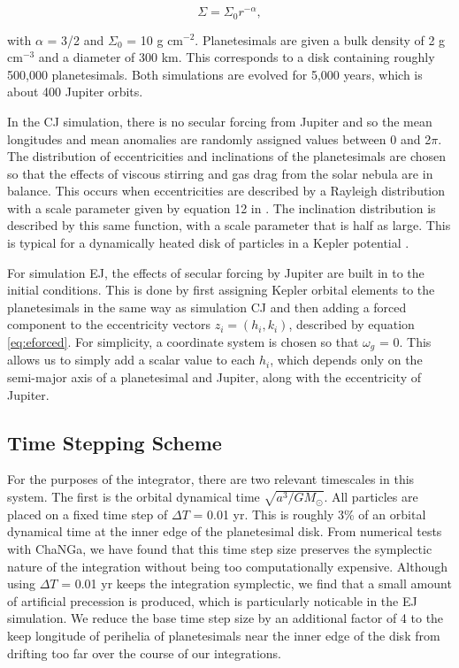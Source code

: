 \documentclass[onecolumn]{aastex63}
\begin{document}
\begin{equation}\label{eq:surf_den}
	\Sigma = \Sigma_{0} r^{-\alpha},
\end{equation}

\noindent with $\alpha$ = 3/2 and $\Sigma_{0}$ = 10 g cm$^{-2}$. Planetesimals are given a bulk density of 2 g cm$^{-3}$ and a 
diameter of 300 km. This corresponds to a disk containing roughly 500,000 planetesimals. Both simulations are evolved for 
5,000 years, which is about 400 Jupiter orbits.

In the CJ simulation, there is no secular forcing from Jupiter and so the mean longitudes and mean anomalies are randomly 
assigned values between 0 and 2$\pi$. The distribution of eccentricities and inclinations of the planetesimals are chosen so that the 
effects of viscous stirring and gas drag from the solar nebula are in balance. This occurs when eccentricities are described by a 
Rayleigh distribution with a scale parameter given by equation 12 in \citet{2002ApJ...581..666K}. The inclination distribution is 
described by this same function, with a scale parameter that is half as large. This is typical for a dynamically heated disk 
of particles in a Kepler potential \citep{1993MNRAS.263..875I}.

For simulation EJ, the effects of secular forcing by Jupiter are built in to the initial conditions. This is done by first assigning Kepler 
orbital elements to the planetesimals in the same way as simulation CJ and then adding a forced component to the eccentricity 
vectors $z_{i} = \left( h_{i}, k_{i} \right)$, described by equation \ref{eq:eforced}. For simplicity, a coordinate system is chosen so that 
$\omega_{g}$ = 0. This allows us to simply add a scalar value to each $h_{i}$, which depends only on the semi-major axis of a 
planetesimal and Jupiter, along with the eccentricity of Jupiter.

\subsection{Time Stepping Scheme}\label{sec:timestep}

For the purposes of the integrator, there are two relevant timescales in this system. The first is the orbital dynamical time $\sqrt{a^3/
G M_{\odot}}$. All particles are placed on a fixed time step of $\Delta T$ = 0.01 yr. This is roughly 3\% of an orbital dynamical time at 
the inner edge of the planetesimal disk. From numerical tests with {\sc ChaNGa}, we have found that this time step size preserves 
the symplectic nature of the integration without being too computationally expensive. Although using $\Delta T$ = 0.01 yr keeps the 
integration symplectic, we find that a small amount of artificial precession is produced, which is particularly noticable in the EJ 
simulation. We reduce the base time step size by an additional factor of 4 to the keep longitude of perihelia of planetesimals near the 
inner edge of the disk from drifting too far over the course of our integrations.
\end{document}
